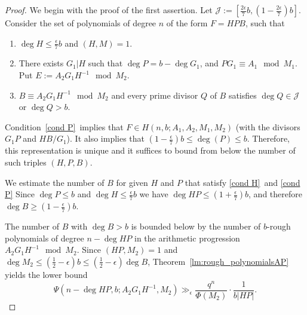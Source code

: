 \documentclass[12pt]{amsart}
\numberwithin{equation}{section}
\theoremstyle{definition}
\theoremstyle{remark}
\begin{document}
\begin{proof}
    We begin with the proof of the first assertion. Let $\mathcal{J} := [\frac{2\epsilon}{7} b,(1-\frac{2\epsilon}{7}) b]$.
    Consider the set of polynomials of degree $n$ of the form $F=HPB$, such that
    \begin{enumerate}[label=\arabic*.]
        \item $\deg H \leq \frac{\epsilon}{7} b$ and  $(H,M)=1$. \label{cond H}
        \item There exists $G_1 | H$ such that $\deg P = b - \deg G_1$, and $P G_1 \equiv A_1 \mod M_1$. \label{cond P} Put $E:=A_2G_1H^{-1}\mod M_2$.
        \item $B \equiv A_2 G_1H^{-1} 
        \mod M_2$ and every prime divisor $Q$ of $B$ satisfies $\deg Q \in \mathcal{J}$ or $\deg Q > b$. \label{cond B}
    \end{enumerate}
    Condition~\ref{cond P}\ implies that $F\in H(n,b;A_1,A_2,M_1,M_2)$ (with the divisors $G_1P$ and $HB/G_1$). It also implies that $(1-\frac{\epsilon}{7}) b \leq \deg (P)\leq b$. Therefore, this representation is unique and it suffices to bound from below the number of such triples $(H,P,B)$. 
    
    We estimate the number of $B$ for given $H$ and $P$ that satisfy \ref{cond H}\ and \ref{cond P} 
    Since $\deg P \leq b$ and $\deg H \leq \frac{\epsilon}{7}b$ we have $\deg HP\leq (1+\frac{\epsilon}{7})b$, and therefore $\deg B\geq (1-\frac{\epsilon}{7})b$.
    
    The number of $B$ with $\deg B>b$ is bounded below by the number of $b$-rough polynomials of degree $n-\deg HP$ in the arithmetic progression $A_2G_1H^{-1}\mod M_2$.  
    Since $(HP,M_2)=1$ and $\deg M_2 \leq (\frac{1}{2}-\epsilon)b \leq (\frac{1}{2}-\epsilon)\deg B$, Theorem~\ref{lm:rough_polynomialsAP} yields the lower bound
    \[
        \Psi(n-\deg HP,b; A_2G_1H^{-1}, M_2)
        \gg_{\epsilon} \frac{q^n}{\Phi(M_2)}\cdot \frac{1}{b|HP|}.
    \] 
    

\end{proof}
\end{document}
